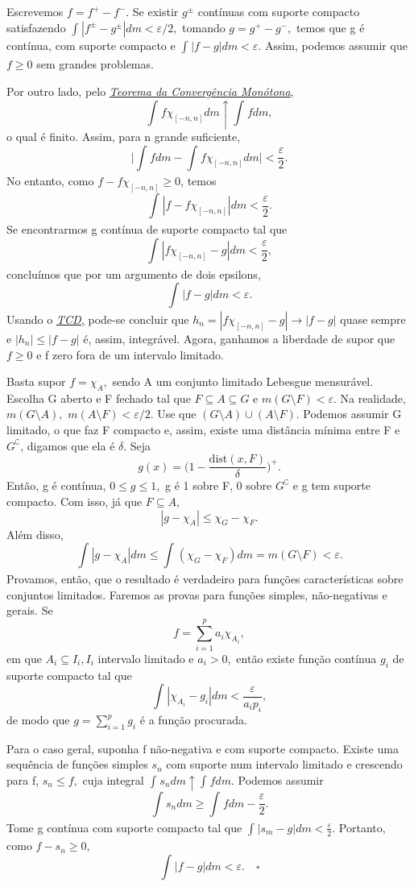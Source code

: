 \documentclass[MeasureTheory/measure_theory.tex]{subfiles}
\begin{document}
\begin{proof*}
	Escrevemos \(f = f^{+} - f^{-}.\) Se existir \(g^{\pm} \) contínuas com suporte compacto satisfazendo \(\int_{}|f^{\pm} - g^{\pm}| dm < \varepsilon /2,\)
	tomando \(g = g^{+} - g^{-},\) temos que g é contínua, com suporte compacto e \(\int_{}|f-g| dm < \varepsilon .\) Assim, podemos assumir que \(f\geq 0\) sem grandes problemas.

	Por outro lado, pelo \hyperlink{monotone_convergence}{\textit{Teorema da Convergência Monótona}},
	\[
		\int_{}f \chi_{[-n, n]} dm \uparrow \int_{}f dm,
	\]
	o qual é finito. Assim, para n grande suficiente,
	\[
		\biggl\vert \int_{}f dm - \int_{}f \chi_{[-n, n]} dm \biggr\vert < \frac{\varepsilon }{2}.
	\]
	No entanto, como \(f - f \chi_{[-n, n]} \geq 0\), temos
	\[
		\int_{}|f - f \chi_{[-n, n]}| dm < \frac{\varepsilon }{2}.
	\]
	Se encontrarmos g contínua de suporte compacto tal que
	\[
		\int_{}|f \chi_{[-n, n]} - g| dm < \frac{\varepsilon }{2},
	\]
	concluímos que por um argumento de dois epsilons,
	\[
		\int_{}|f-g| dm < \varepsilon.
	\]
	Usando o \hyperlink{monotone_convergence}{\textit{TCD,}} pode-se concluir que \(h_{n} = |f \chi_{[-n, n]} - g|\to |f-g|\) quase sempre e \(|h_{n}| \leq |f-g|\) é, assim, integrável. Agora, ganhamos a liberdade de supor que \(f \geq 0\) e
	f zero fora de um intervalo limitado.

	Basta supor \(f=\chi_{A},\) sendo A um conjunto limitado Lebesgue mensurável. Escolha G aberto e F fechado tal que \(F\subseteq A\subseteq G\) e \(m(G\setminus{F}) < \varepsilon.\) Na realidade,
	\(m(G\setminus{A}),\) \(m(A\setminus{F}) < \varepsilon /2.\) Use que \((G\setminus{A})\cup (A\setminus{F}).\) Podemos assumir G limitado, o que faz F compacto e, assim, existe uma distância mínima entre F e \(G^{\complement}\), digamos que ela é \(\delta \). Seja
	\[
		g(x) = \biggl(1 - \frac{\mathrm{dist}(x, F)}{\delta }\biggr)^{+}.
	\]
	Então, g é contínua, \(0\leq g \leq 1, \) g é 1 sobre F, 0 sobre \(G ^{\complement}\) e g tem suporte compacto. Com isso, já que \(F\subseteq A\),
	\[
		|g- \chi_{A}|\leq \chi_{G} - \chi_{F}.
	\]
	Além disso,
	\[
		\int_{}|g-\chi_{A}| dm \leq \int_{}(\chi_{G} - \chi_{F}) dm = m(G\setminus{F})<\varepsilon .
	\]
	Provamos, então, que o resultado é verdadeiro para funções características sobre conjuntos limitados. Faremos as provas para funções simples, não-negativas e gerais. Se
	\[
		f= \sum\limits_{i=1}^{p}a_{i}\chi_{A_{i}},
	\]
	em que \(A_{i}\subseteq I_{i}, I_{i}\) intervalo limitado e \(a_{i} > 0,\) então existe função contínua \(g_{i}\) de suporte compacto tal que
	\[
		\int_{}|\chi_{A_{i}} - g_{i}| dm < \frac{\varepsilon }{a_{i}p_{i}},
	\]
	de modo que \(g=\sum\limits_{i=1}^{p}g_{i}\) é a função procurada.

	Para o caso geral, suponha f não-negativa e com suporte compacto. Existe uma sequência de funções simples \(s_{n}\) com suporte num intervalo limitado e crescendo
	para f, \(s_{n}\leq f,\) cuja integral \(\int_{}s_{n} dm \uparrow \int_{}f dm.\) Podemos assumir
	\[
		\int_{}s_{n} dm \geq \int_{}f dm - \frac{\varepsilon }{2}.
	\]
	Tome g contínua com suporte compacto tal que \(\int_{}|s_{m} - g| dm < \frac{\varepsilon }{2}.\) Portanto, como \(f - s_{n}\geq 0,\)
	\[
		\int_{}|f-g| dm < \varepsilon .\quad \square
	\]
\end{proof*}
\end{document}
